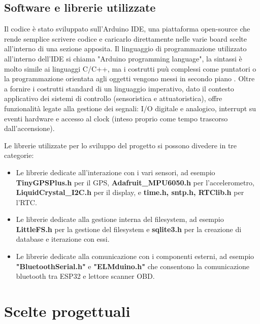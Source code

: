 \documentclass[12pt, a4paper, italian]{report}
\numberwithin{figure}{chapter}
\numberwithin{table}{chapter}
\begin{document}
\subsection{Software e librerie utilizzate}
Il codice è stato sviluppato sull'Arduino IDE, una piattaforma open-source che rende semplice scrivere codice e caricarlo direttamente nelle varie board scelte all'interno di una sezione apposita. Il linguaggio di programmazione utilizzato all'interno dell'IDE si chiama "Arduino programming language", la sintassi è molto simile ai linguaggi C/C++, ma i costrutti puù complessi come puntatori o la programmazione orientata agli oggetti vengono messi in secondo piano \cite{sistemiEmbeddedAtrent}. Oltre a fornire i costrutti standard di un linguaggio imperativo, dato il contesto applicativo dei sistemi di controllo (sensoristica e attuatoristica), offre funzionalità legate alla gestione dei segnali: I/O digitale e analogico, interrupt su eventi hardware e accesso al clock (inteso proprio come tempo trascorso dall'accensione).

Le librerie utilizzate per lo sviluppo del progetto si possono divedere in tre categorie:

\begin{itemize}
    \item Le librerie dedicate all'interazione con i vari sensori, ad esempio \textbf{TinyGPSPlus.h} per il GPS, \textbf{Adafruit\_MPU6050.h} per l'accelerometro, \textbf{LiquidCrystal\_I2C.h} per il display, e \textbf{time.h, sntp.h, RTClib.h} per l'RTC.
    \item Le librerie dedicate alla gestione interna del filesystem, ad esempio \textbf{LittleFS.h} per la gestione del filesystem e \textbf{sqlite3.h} per la creazione di database e iterazione con essi.
    \item Le librerie dedicate alla comunicazione con i componenti esterni, ad esempio \textbf{"BluetoothSerial.h"} e \textbf{"ELMduino.h"} che consentono la comunicazione bluetooth tra ESP32 e lettore scanner OBD.
\end{itemize}

\section{Scelte progettuali}
\end{document}

